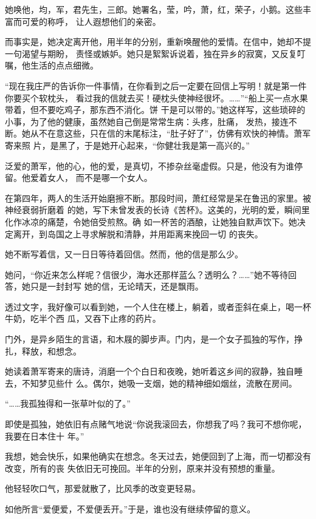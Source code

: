 		她唤他，均，军，君先生，三郎。她署名，莹，吟，萧，红，荣子，小鹅。这些丰富而可爱的称呼，
	让人遐想他们的亲密。

		而事实是，她决定离开他，用半年的分别，重新唤醒他的爱情。在信中，她却不提一句渴望与期盼，
	责怪或嫉妒。她只是絮絮诉说着，独在异乡的寂寞，又反复叮嘱，他生活的点点细微。


		“现在我庄严的告诉你一件事情，在你看到之后一定要在回信上写明！就是第一件你要买个软枕头，
	看过我的信就去买！硬枕头使神经很坏。……”“船上买一点水果带着，但不要吃鸡子，那东西不消化。饼
	干是可以带的。”她这样写，这些琐碎的小事，为了他的健康，虽然她自己倒是常常生病：头疼，肚痛，
	发热，接连不断。她从不在意这些，只在信的末尾标注，“肚子好了”，仿佛有欢快的神情。萧军寄来照
	片，是黑了，于是她开心起来，“你健壮我是第一高兴的。”


		泛爱的萧军，他的心，他的爱，是真切，不掺杂丝毫虚假。只是，他没有为谁停留。他爱着女人，
	而不是哪一个女人。

		在第四年，两人的生活开始磨擦不断。那段时间，萧红经常是呆在鲁迅的家里。被神经衰弱折磨着
	的她，写下未曾发表的长诗《苦杯》。这美的，光明的爱，瞬间里化作冰凉的痛楚，令她倍受煎熬。确
	如一杯苦的酒酿，让她独自默声饮下。她决定离开，到岛国之上寻求解脱和清静，并用距离来挽回一切
	的丧失。


		她不断写着信，又一日日等待着回信。然而，他的信是那么少。

		她问，“你近来怎么样呢？信很少，海水还那样蓝么？透明么？……”她不等待回答，她只是一封封写
	她的信，无论晴天，还是飘雨。

		透过文字，我好像可以看到她，一个人住在楼上，躺着，或者歪斜在桌上，喝一杯牛奶，吃半个西
	瓜，又吞下止疼的药片。

		门外，是异乡陌生的言语，和木屐的脚步声。门内，是一个女子孤独的写作，挣扎，释放，和想念。

		她读着萧军寄来的唐诗，消磨一个个白日和夜晚，她听着这乡间的寂静，独自睡去，不知梦见些什
	么。偶尔，她吸一支烟，她的精神细如烟丝，流散在房间。

		“……我孤独得和一张草叶似的了。”

		即使是孤独，她依旧有点赌气地说“你说我滚回去，你想我了吗？我可不想你呢，我要在日本住十
	年。”

		我想，她会快乐，如果他确实在想念。冬天过去，她便回到了上海，而一切都没有改变，所有的丧
	失依旧无可挽回。半年的分别，原来并没有预想的重量。

		他轻轻吹口气，那爱就散了，比风季的改变更轻易。

		如他所言“爱便爱，不爱便丢开。”于是，谁也没有继续停留的意义。

